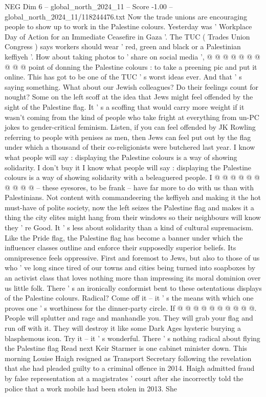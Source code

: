 \begin{textsample}{NEG Dim 6 – global\_north\_2024\_11 – Score -1.00 – global\_north\_2024\_11/118244476.txt}
Now the trade unions are encouraging people to show up to work in the Palestine colours.
Yesterday was ' Workplace Day of Action for an Immediate Ceasefire in Gaza '.
The TUC ( Trades Union Congress ) says workers should wear ' red, green and black or a Palestinian keffiyeh '.
How about taking photos to ' share on social media ', @ @ @ @ @ @ @ @ @ @ point of donning the Palestine colours : to take a preening pic and put it online.
This has got to be one of the TUC ' s worst ideas ever.
And that ' s saying something.
What about our Jewish colleagues?
Do their feelings count for nought?
Some on the left scoff at the idea that Jews might feel offended by the sight of the Palestine flag.
It ' s a scoffing that would carry more weight if it wasn't coming from the kind of people who take fright at everything from un-PC jokes to gender-critical feminism.
Listen, if you can feel offended by JK Rowling referring to people with penises as men, then Jews can feel put out by the flag under which a thousand of their co-religionists were butchered last year.
I know what people will say : displaying the Palestine colours is a way of showing solidarity.
I don't buy it I know what people will say : displaying the Palestine colours is a way of showing solidarity with a beleaguered people.
I @ @ @ @ @ @ @ @ @ @ -- these eyesores, to be frank -- have far more to do with us than with Palestinians.
Not content with commandeering the keffiyeh and making it the hot must-have of polite society, now the left seizes the Palestine flag and makes it a thing the city elites might hang from their windows so their neighbours will know they ' re Good.
It ' s less about solidarity than a kind of cultural supremacism.
Like the Pride flag, the Palestine flag has become a banner under which the influencer classes outline and enforce their supposedly superior beliefs.
Its omnipresence feels oppressive.
First and foremost to Jews, but also to those of us who ' ve long since tired of our towns and cities being turned into soapboxes by an activist class that loves nothing more than impressing its moral dominion over us little folk.
There ' s an ironically conformist bent to these ostentatious displays of the Palestine colours.
Radical?
Come off it -- it ' s the means with which one proves one ' s worthiness for the dinner-party circle.
If @ @ @ @ @ @ @ @ @ @.
People will splutter and rage and manhandle you.
They will grab your flag and run off with it.
They will destroy it like some Dark Ages hysteric burying a blasphemous icon.
Try it -- it ' s wonderful.
There ' s nothing radical about flying the Palestine flag Read next Keir Starmer is one cabinet minister down.
This morning Louise Haigh resigned as Transport Secretary following the revelation that she had pleaded guilty to a criminal offence in 2014.
Haigh admitted fraud by false representation at a magistrates ' court after she incorrectly told the police that a work mobile had been stolen in 2013.
She

\end{textsample}
